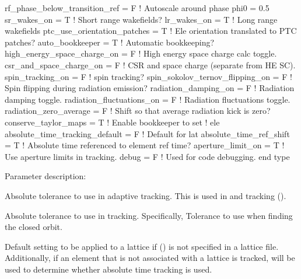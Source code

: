 {\begin{example}
    rf_phase_below_transition_ref = F   ! Autoscale around phase phi0 = 0.5
    sr_wakes_on = T                     ! Short range wakefields?
    lr_wakes_on = T                     ! Long range wakefields
    ptc_use_orientation_patches = T     ! Ele orientation translated to PTC patches?
    auto_bookkeeper = T                 ! Automatic bookkeeping?
    high_energy_space_charge_on = F     ! High energy space charge calc toggle.
    csr_and_space_charge_on = F         ! CSR and space charge (separate from HE SC).
    spin_tracking_on = F                ! spin tracking?
    spin_sokolov_ternov_flipping_on = F ! Spin flipping during radiation emission?
    radiation_damping_on = F            ! Radiation damping toggle.
    radiation_fluctuations_on = F       ! Radiation fluctuations toggle.
    radiation_zero_average = F          ! Shift so that average radiation kick is zero?
    conserve_taylor_maps = T            ! Enable bookkeeper to set
                                        ! ele%
    absolute_time_tracking_default = F  ! Default for lat%
    absolute_time_ref_shift = T         ! Absolute time referenced to element ref time?
    aperture_limit_on = T               ! Use aperture limits in tracking.
    debug = F                           ! Used for code debugging.
  end type
\end{example}

Parameter description:
\begin{description}
\item[\vn{abs_tol_adaptive_tracking}] \Newline
Absolute tolerance to use in adaptive tracking. This is used in  and
 tracking ().
%
\item[\vn{abs_tol_tracking}] \Newline
Absolute tolerance to use in tracking. Specifically, Tolerance to use when finding the closed orbit.
%
\item[\vn{absolute_time_tracking_default}] \Newline
Default setting to be applied to a lattice if  () is not
specified in a lattice file. Additionally, if an element that is not associated with a lattice is
tracked,  will be used to determine whether absolute time
tracking is used.


\end{description}}
